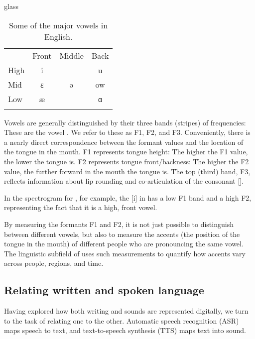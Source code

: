\begin{tblsfilledsymbol}{}{glass}
\begin{underthehood}
\begin{table}[H]
\begin{tabular}{lccc}
\lsptoprule
     & Front         & Middle      & Back \\
High & {i}   &             & {u} \\
Mid  & ɛ   & ə & {ow} \\
Low  & æ &             & ɑ \\
\lspbottomrule
\end{tabular}
\caption{Some of the major vowels in English.}
\label{tab:vowels}
\end{table}

Vowels are generally distinguished by their three bands (stripes) of
frequencies: These are the vowel . We refer to these
as F1, F2, and F3.  Conveniently, there is a nearly direct
correspondence between the formant values and the location of the
tongue in the mouth.  F1 represents tongue height: The higher the F1 value, the lower the tongue
is.  F2 represents tongue front/backness: The higher the F2 value, the further forward in the mouth the tongue is.   The top (third) band, F3, reflects information about lip rounding and co-articulation of the consonant [{\textturnr}].

 In the spectrogram for ,
for example, the {[i]} in  has a low F1 band and
a high F2, representing the fact that it is a high, front vowel.

By measuring the formants F1 and F2, it is not just possible to distinguish between different vowels, but also to measure the accents (the position of the tongue in the mouth) of different people who are pronouncing the same vowel.  The linguistic subfield of  uses such measurements to quantify how accents vary across people, regions, and time.

\end{underthehood}
\end{tblsfilledsymbol}


\subsection{Relating written and spoken language}

Having explored how both writing and sounds are represented digitally, we turn to the task of relating one to the other.    Automatic speech recognition (ASR) maps speech to text, and text-to-speech synthesis (TTS) maps text into sound.
  
